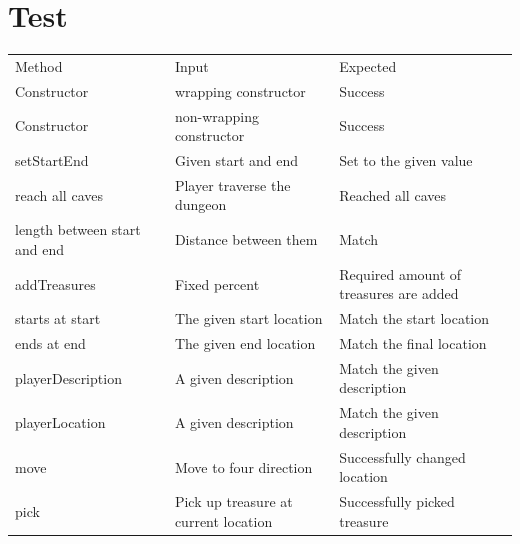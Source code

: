 \documentclass[12pt]{amsart}
\begin{document}
\newpage
\section{Test}

\begin{table}[htbp]
   \begin{tabular}{@{} lll @{}} %

      Method     & Input & Expected \\
         Constructor   & wrapping constructor    &  Success\\
         Constructor   & non-wrapping constructor     & Success\\
         setStartEnd & Given start and end & Set to the given value\\
         reach all caves & Player traverse the dungeon & Reached all caves\\
         length between start and end & Distance between them & Match\\
         addTreasures & Fixed percent & Required amount of treasures are added\\
         starts at start & The given start location & Match the start location\\
         ends at end & The given end location & Match the final location\\
         playerDescription & A given description & Match the given description\\
         playerLocation & A given description & Match the given description\\
         move & Move to four direction & Successfully changed location\\
         pick & Pick up treasure at current location & Successfully picked treasure\\
         
 
    \end{tabular}
\end{table}
\end{document}
